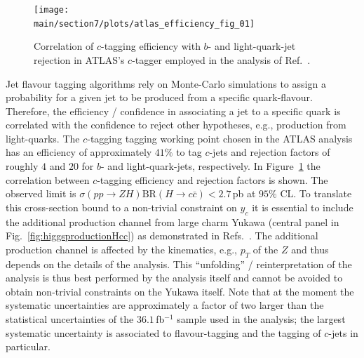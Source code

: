 \documentclass[../report.tex]{subfiles}
\providecommand{\main}{..}
\begin{document}
\begin{figure}[h]
	\centering
	\texttt{[image: \\main/section7/plots/atlas\_efficiency\_fig\_01]}
	\caption{Correlation of $c$-tagging efficiency with $b$- and light-quark-jet rejection
	in ATLAS's $c$-tagger employed in the analysis of Ref.~\cite{Aaboud:2018fhh}.
\label{fig:ATLASctagefficiency}}
\end{figure}

Jet flavour tagging algorithms rely on Monte-Carlo simulations  to assign a probability 
for a given jet to be produced from a specific quark-flavour. 
Therefore, the efficiency / confidence in associating a jet to a specific quark is 
correlated with the confidence to reject other hypotheses, e.g., production from light-quarks.
The $c$-tagging tagging working point chosen in the ATLAS analysis \cite{Aaboud:2018fhh}  has an  efficiency of approximately $41\%$
to tag $c$-jets and rejection factors of roughly $4$ and $20$ for $b$- and light-quark-jets, respectively.
In Figure~\ref{fig:ATLASctagefficiency} 
the correlation between $c$-tagging efficiency and rejection factors is shown.
The observed limit is $\sigma(pp\to ZH)\text{BR}(H\to c\bar c)<2.7$\,pb at $95\%$ CL.
To translate this cross-section bound to a non-trivial constraint on $y_c$ it is essential 
to include the additional production channel from large charm Yukawa 
(central panel in Fig.~\ref{fig:higgsproductionHcc}) as demonstrated in Refs.~\cite{Perez:2015aoa}.
The additional production channel is affected by the kinematics, e.g., $p_T$ of the 
$Z$ and thus depends on the details of the analysis. 
This ``unfolding'' / reinterpretation of the analysis is thus best performed by 
the analysis itself and cannot be avoided to obtain non-trivial constraints on the Yukawa itself.
Note that at the moment the systematic uncertainties are approximately a factor of two
larger than the statistical uncertainties of the $36.1$\,fb$^{-1}$ sample used in the analysis;
the largest systematic uncertainty is associated to flavour-tagging and the tagging of $c$-jets in particular.
\end{document}
